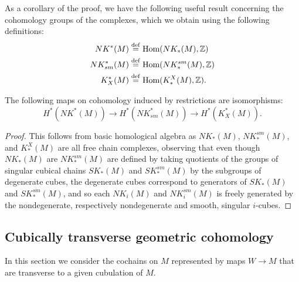 As a corollary of the proof, we have the following useful result concerning the cohomology groups of the complexes, which we obtain using the following definitions:
\begin{align*}
	NK^*(M)& \stackrel{\mathrm{def}}{=} \textup{Hom}(NK_*(M),\mathbb{Z})\\
	NK_{sm}^*(M)& \stackrel{\mathrm{def}}{=} \textup{Hom}(NK^{sm}_*(M),\mathbb{Z})\\
	K^*_X(M)& \stackrel{\mathrm{def}}{=} \textup{Hom}(K^X_*(M),\mathbb{Z}).
\end{align*}

\begin{corollary}
	The following maps on cohomology induced by restrictions are isomorphisms: $$H^*(NK^*(M)) \to H^*(NK_{sm}^*(M)) \to H^*(K^*_X(M)).$$
\end{corollary}

\begin{proof}
	This follows from basic homological algebra \cite[Theorem 45.5]{Mun84} as $NK_*(M)$, $NK^{sm}_*(M)$, and $K^X_*(M)$ are all free chain complexes, observing that even though $NK_*(M)$ are $NK^{sm}_*(M)$ are defined by taking quotients of the groups of singular cubical chains $SK_*(M)$ and $SK^{sm}_*(M)$ by the subgroups of degenerate cubes, the degenerate cubes correspond to generators of $SK_*(M)$ and $SK^{sm}_*(M)$, and so each $NK_i(M)$ and $NK^{sm}_i(M)$ is freely generated by the nondegenerate, respectively nondegenerate and smooth, singular $i$-cubes.
\end{proof}

\subsection{Cubically transverse geometric cohomology}\label{S: transverse cochains}

In this section we consider the cochains on $M$ represented by maps $W \to M$ that are transverse to a given cubulation of $M$.

